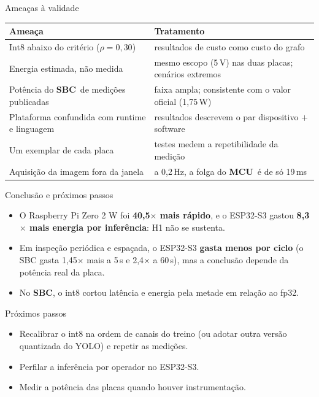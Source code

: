 \documentclass[aspectratio=169,11pt]{beamer}
\newcommand{\mcu}{\textcolor{roxo}{\textbf{MCU}}}
\newcommand{\sbc}{\textcolor{azul}{\textbf{SBC}}}
\newcommand{\destaque}[1]{\textcolor{azul}{\textbf{#1}}}
\begin{document}
\begin{frame}{Ameaças à validade}
\small
\begin{tabularx}{\linewidth}{LL}\toprule
Ameaça & Tratamento\\\midrule
Int8 abaixo do critério ($\rho=0{,}30$) & resultados de custo como custo do grafo\\
Energia estimada, não medida & mesmo escopo (5\,V) nas duas placas; cenários extremos\\
Potência do \sbc\ de medições publicadas & faixa ampla; consistente com o valor oficial (1,75\,W)\\
Plataforma confundida com runtime e linguagem & resultados descrevem o par dispositivo $+$ software\\
Um exemplar de cada placa & testes medem a repetibilidade da medição\\
Aquisição da imagem fora da janela & a 0,2\,Hz, a folga do \mcu\ é de só 19\,ms\\\bottomrule
\end{tabularx}
\end{frame}

\begin{frame}{Conclusão e próximos passos}
\begin{itemize}
\item O Raspberry Pi Zero 2 W foi \destaque{40,5$\times$ mais rápido}, e o ESP32-S3 gastou \destaque{8,3$\times$ mais energia por inferência}: H1 não se sustenta.
\item Em inspeção periódica e espaçada, o ESP32-S3 \destaque{gasta menos por ciclo} (o SBC gasta 1,45$\times$ mais a 5\,s e 2,4$\times$ a 60\,s), mas a conclusão depende da potência real da placa.
\item No \sbc, o int8 cortou latência e energia pela metade em relação ao fp32.
\end{itemize}
\vspace{0.15cm}
\begin{block}{Próximos passos}
\begin{itemize}\small
\item Recalibrar o int8 na ordem de canais do treino (ou adotar outra versão quantizada do YOLO) e repetir as medições.
\item Perfilar a inferência por operador no ESP32-S3.
\item Medir a potência das placas quando houver instrumentação.
\end{itemize}
\end{block}
\end{frame}
\end{document}
